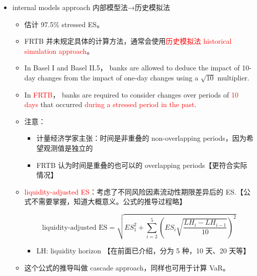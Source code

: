 \begin{itemize}
\item[2] internal models approach 内部模型法→历史模拟法
    \begin{itemize}
    \item 估计 97.5\% stressed ES。
        \item FRTB 并未规定具体的计算方法，通常会使用\textcolor{red}{历史模拟法 historical simulation approach}。
        \item In Basel I and Basel II.5， banks are allowed to deduce the impact of 10-day changes from the impact of one-day changes using a $\sqrt{10}$ multiplier.
        \item In \textcolor{red}{FRTB}， banks are required to consider changes over periods of \textcolor{red}{10 days} that occurred \textcolor{red}{during a stressed period in the past}.
        \item 注意：
            \begin{itemize}
            \item 计量经济学家主张：时间是非重叠的 non-overlapping periods，因为希望观测值是独立的
            \item FRTB 认为时间是重叠的也可以的 overlapping periods【更符合实际情况】
            \end{itemize}
        \item \textcolor{red}{liquidity-adjusted ES}：考虑了不同风险因素流动性期限差异后的 ES.【公式不需要掌握，知道大概意义。公式的推导过程略】
    
    \[ \text{liquidity-adjusted ES} = \sqrt{ES_1^2 + \sum_{i=2}^5 (ES_i\sqrt{\frac{LH_i-LH_{i-1}}{10}})^2} \]
        \begin{itemize}
        \item LH: liquidity horizon 【在前面已介绍，分为 5 种，10 天、20 天等】
        \end{itemize}
    \item 这个公式的推导叫做 cascade approach，同样也可用于计算 VaR。
    \end{itemize}
\end{itemize}






















